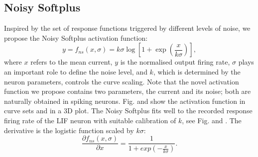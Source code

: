\documentclass[runningheads,a4paper]{llncs}
\begin{document}
	\subsection{Noisy Softplus}
	Inspired by the set of response functions triggered by different levels of noise, we propose the Noisy Softplus activation function:
	\begin{equation}
	y = f_{ns}(x, \sigma) = k \sigma \log [1 + \exp(\frac{x}{k \sigma})],
	\label{equ:nsp}
	\end{equation}
	where $x$ refers to the mean current, $y$ is the normalised output firing rate, $\sigma$ plays an important role to define the noise level, and $k$, which is determined by the neuron parameters, controls the curve scaling.
	Note that the novel activation function we propose contains two parameters, the current and its noise; both are naturally obtained in spiking neurons.
	Fig. and  show the activation function in curve sets and in a 3D plot.
	The Noisy Softplus fits well to the recorded response firing rate of the LIF neuron with suitable calibration of $k$, see Fig. and .
	The derivative is the logistic function scaled by $k\sigma$:
	\begin{equation}
	\frac{\partial f_{ns}(x,\sigma)}{\partial x} = \frac{1}{1+exp(-\frac{x}{k\sigma})}.
	\label{equ:logist}
	\end{equation}	
	
\end{document}
